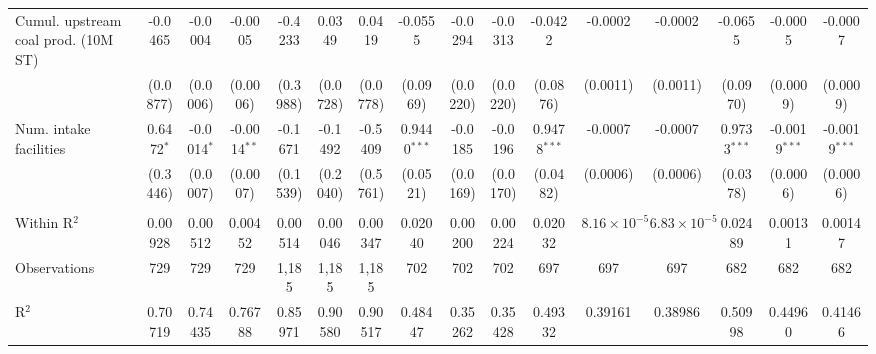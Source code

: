 \begin{table}[htbp]
\begin{adjustbox}{width = \textwidth, center}
\begin{tabular}{lccccccccccccccc}
         \midrule 
         Cumul. upstream coal prod. (10M ST) & -0.0465           & -0.0004            & -0.0005           & -0.4233           & 0.0349             & 0.0419            & -0.0555           & -0.0294            & -0.0313           & -0.0422           & -0.0002               & -0.0002               & -0.0655           & -0.0005            & -0.0007\\   
                                             & (0.0877)          & (0.0006)           & (0.0006)          & (0.3988)          & (0.0728)           & (0.0778)          & (0.0969)          & (0.0220)           & (0.0220)          & (0.0876)          & (0.0011)              & (0.0011)              & (0.0970)          & (0.0009)           & (0.0009)\\   
         Num. intake facilities              & 0.6472$^{*}$      & -0.0014$^{*}$      & -0.0014$^{**}$    & -0.1671           & -0.1492            & -0.5409           & 0.9440$^{***}$    & -0.0185            & -0.0196           & 0.9478$^{***}$    & -0.0007               & -0.0007               & 0.9733$^{***}$    & -0.0019$^{***}$    & -0.0019$^{***}$\\   
                                             & (0.3446)          & (0.0007)           & (0.0007)          & (0.1539)          & (0.2040)           & (0.5761)          & (0.0521)          & (0.0169)           & (0.0170)          & (0.0482)          & (0.0006)              & (0.0006)              & (0.0378)          & (0.0006)           & (0.0006)\\   
         
          \\
         
         Within R$^2$                        & 0.00928           & 0.00512            & 0.00452           & 0.00514           & 0.00046            & 0.00347           & 0.02040           & 0.00200            & 0.00224           & 0.02032           & $8.16\times 10^{-5}$  & $6.83\times 10^{-5}$  & 0.02489           & 0.00131            & 0.00147\\  
         Observations                        & 729               & 729                & 729               & 1,185             & 1,185              & 1,185             & 702               & 702                & 702               & 697               & 697                   & 697                   & 682               & 682                & 682\\  
         R$^2$                               & 0.70719           & 0.74435            & 0.76788           & 0.85971           & 0.90580            & 0.90517           & 0.48447           & 0.35262            & 0.35428           & 0.49332           & 0.39161               & 0.38986               & 0.50998           & 0.44960            & 0.41466\\  
         

\end{tabular}
\end{adjustbox}
\end{table}

